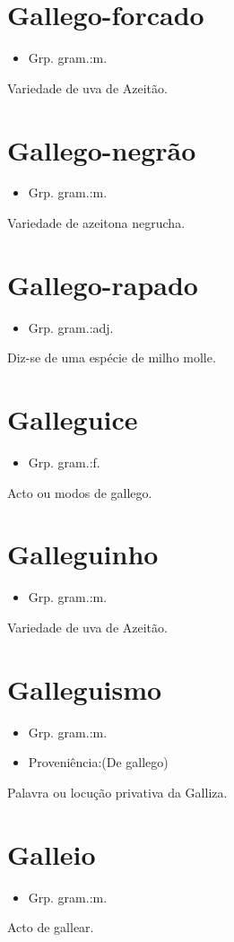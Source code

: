 \section{Gallego-forcado}
\begin{itemize}
\item {Grp. gram.:m.}
\end{itemize}
Variedade de uva de Azeitão.
\section{Gallego-negrão}
\begin{itemize}
\item {Grp. gram.:m.}
\end{itemize}
Variedade de azeitona negrucha.
\section{Gallego-rapado}
\begin{itemize}
\item {Grp. gram.:adj.}
\end{itemize}
Diz-se de uma espécie de milho molle.
\section{Galleguice}
\begin{itemize}
\item {Grp. gram.:f.}
\end{itemize}
Acto ou modos de gallego.
\section{Galleguinho}
\begin{itemize}
\item {Grp. gram.:m.}
\end{itemize}
Variedade de uva de Azeitão.
\section{Galleguismo}
\begin{itemize}
\item {Grp. gram.:m.}
\end{itemize}
\begin{itemize}
\item {Proveniência:(De \textunderscore gallego\textunderscore )}
\end{itemize}
Palavra ou locução privativa da Galliza.
\section{Galleio}
\begin{itemize}
\item {Grp. gram.:m.}
\end{itemize}
Acto de gallear.
